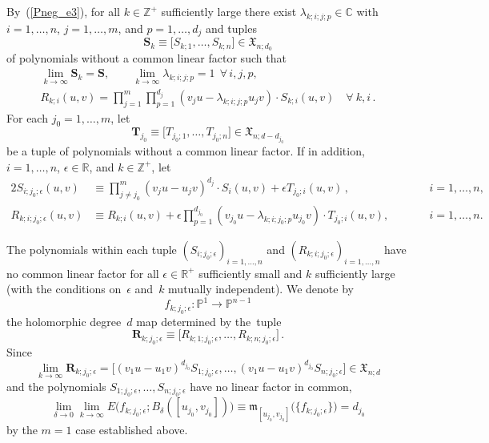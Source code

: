 \documentclass[11pt]{article}
\numberwithin{equation}{section}
\theoremstyle{definition}
\def\BE#1{\begin{equation}\label{#1}}
\def\EE{\end{equation}}
\def\eref#1{(\ref{#1})}
\def\lra{\longrightarrow}
\def\C{\mathbb{C}}
\def\fm{\mathfrak m}
\def\P{\mathbb{P}}
\def\R{\mathbb R}
\def\bR{\mathbf R}
\def\bS{\mathbf S}
\def\bT{\mathbf T}
\def\fX{\mathfrak X}
\def\Z{{\mathbb Z}}
\def\de{\delta}
\def\ep{\epsilon}
\def\la{\lambda}
\def\i{\infty}
\begin{document}
\noindent
By~\eref{Pneg_e3}, for all $k\!\in\!\Z^+$ sufficiently large
there exist $\la_{k;i;j;p}\!\in\!\C$ with  $i\!=\!1,\ldots,n$, $j\!=\!1,\ldots,m$, 
and $p\!=\!1,\ldots,d_j$ and tuples
$$\bS_k\equiv \big[S_{k;1},\ldots,S_{k;n}\big]\in \fX_{n;d_0}$$
of polynomials without a common linear factor such that 
\begin{gather*}
\lim_{k\lra\i}\bS_k=\bS, \qquad \lim_{k\lra\i}\la_{k;i;j;p}=1~~\forall\,i,j,p,\\
R_{k;i}(u,v)=\prod_{j=1}^m\prod_{p=1}^{d_j}(v_ju\!-\!\la_{k;i;j;p}u_jv) 
\cdot S_{k;i}(u,v)\quad\forall~k,i\,.
\end{gather*}
For each $j_0\!=\!1,\ldots,m$, let 
$$\bT_{j_0}\equiv 
\big[T_{j_0;1},\ldots,T_{j_0;n}\big]\in \fX_{n;d-d_{j_0}}$$
be a tuple of polynomials without a common linear factor.
If in addition, $i\!=\!1,\ldots,n$, $\ep\!\in\!\R$, and $k\!\in\!\Z^+$, let
\begin{alignat*}{2}
S_{i;j_0;\ep}(u,v)&\equiv \prod_{j\neq j_0}^m(v_ju\!-\!u_jv)^{d_j} 
\cdot S_i(u,v)+
\ep T_{j_0;i}(u,v)\,, &\qquad &i=1,\ldots,n,\\
R_{k;i;j_0;\ep}(u,v)&\equiv R_{k;i}(u,v)+
\ep\prod_{p=1}^{d_{j_0}}(v_{j_0}u\!-\!\la_{k;i;j_0;p}u_{j_0}v) 
\cdot T_{j_0;i}(u,v), &\qquad &i=1,\ldots,n.
\end{alignat*}

\vspace{.1in}

\noindent
The polynomials within each tuple $(S_{i;j_0;\ep})_{i=1,\ldots,n}$ and 
$(R_{k;i;j_0;\ep})_{i=1,\ldots,n}$ have no common linear factor for 
all $\ep\!\in\!\R^+$ sufficiently small and $k$ sufficiently large 
(with the conditions on~$\ep$ and~$k$ mutually independent).
We denote by 
$$f_{k;j_0;\ep}\!:\P^1\!\lra\!\P^{n-1}$$ 
the holomorphic degree~$d$ map determined by the~tuple
$$\bR_{k;j_0;\ep}\equiv\big[R_{k;1;j_0;\ep},\ldots,R_{k;n;j_0;\ep}\big]\,.$$
Since 
$$\lim_{k\lra\i}\bR_{k;j_0;\ep}
=\big[(v_1u\!-\!u_1v)^{d_{j_0}}S_{1;j_0;\ep},\ldots, (v_1u\!-\!u_1v)^{d_{j_0}}S_{n;j_0;\ep}\big]
\in\fX_{n;d}$$
and the polynomials $S_{1;j_0;\ep},\ldots,S_{n;j_0;\ep}$ have no linear factor in common,
\BE{Pneg_e5}
\lim_{\de\lra0}\lim_{k\lra\i}\!E\big(f_{k;j_0;\ep};B_{\de}([u_{j_0},v_{j_0}])\big)
\equiv \fm_{[u_{j_0},v_{j_0}]}\big(\{f_{k;j_0;\ep}\}\big) =d_{j_0}\EE
by the $m\!=\!1$ case established above.\\
\end{document}
